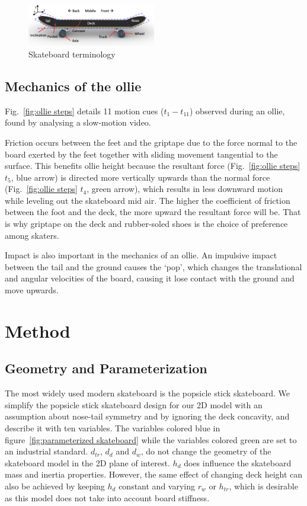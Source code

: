 \documentclass[default,iicol]{sn-jnl}
\begin{document}
\begin{figure}[t]
    \includegraphics[width=0.5\textwidth]{figure/terminology.png}
    \caption[Skateboard terminology]{Skateboard terminology}
    \label{fig:skateboard terminology}
\end{figure}

\subsection{Mechanics of the ollie} \label{ss_mechanics}
Fig.~\ref{fig:ollie steps} details 11 motion cues ($t_1-t_{11}$) observed during an ollie, found by analysing a slow-motion video.

Friction occurs between the feet and the griptape due to the force normal to the board exerted by the feet together with sliding movement tangential to the surface.
This benefits ollie height because the resultant force (Fig.~\ref{fig:ollie steps} $t_5$, blue arrow) is directed more vertically upwards than the normal force (Fig.~\ref{fig:ollie steps} $t_4$, green arrow), which results in less downward motion while leveling out the skateboard mid air.
The higher the coefficient of friction between the foot and the deck, the more upward the resultant force will be.
That is why griptape on the deck and rubber-soled shoes is the choice of preference among skaters.

Impact is also important in the mechanics of an ollie.
An impulsive impact between the tail and the ground causes the `pop', which changes the translational and angular velocities of the board, causing it lose contact with the ground and move upwards.

\section{Method}

\subsection{Geometry and Parameterization}\label{s_paropt}
The most widely used modern skateboard is the popsicle stick skateboard. We simplify the popsicle stick skateboard design for our 2D model with an assumption about nose-tail symmetry and by ignoring the deck concavity, and describe it with ten variables. The variables colored blue in figure~\ref{fig:parameterized skateboard} while the variables colored green are set to an industrial standard. $d_{tr}$, $d_d$ and $d_w$, do not change the geometry of the skateboard model in the 2D plane of interest. $h_d$ does influence the skateboard mass and inertia properties. However, the same effect of changing deck height can also be achieved by keeping $h_d$ constant and varying $r_w$ or $h_{tr}$, which is desirable as this model does not take into account board stiffness.
\end{document}
